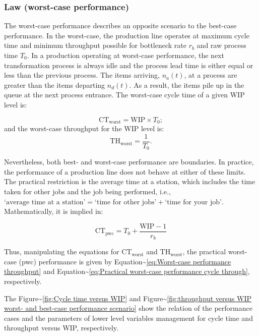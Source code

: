 \documentclass{article}
\begin{document}
\subsubsection{Law (worst-case performance)}
\label{sec:orgefeb215}

The worst-case performance describes an opposite scenario to the best-case performance.
In the worst-case, the production line operates at maximum cycle time and minimum throughput possible for bottleneck rate \(r_b\) and raw process time \(T_0\).
In a production operating at worst-case performance, the next transformation process is always idle and the process lead time is either equal or less than the previous process.
The items arriving, \(n_a(t)\), at a process are greater than the items departing \(n_d(t)\).
As a result, the items pile up in the queue at the next process entrance.
The worst-case cycle time of a given WIP level is:

\begin{equation}\label{eq:Worst-case performance cycle through}
    \mbox{CT}_{\mbox{worst}} = \mbox{WIP} \times T_0;
\end{equation}
\nolinebreak
and the worst-case throughput for the WIP level is:
\begin{equation}\label{eq:Worst-case performance throughput}
    \mbox{TH}_{\mbox{worst}} = \frac{1}{T_0}.
\end{equation}

Nevertheless, both best- and worst-case performance are boundaries.
In practice, the performance of a production line does not behave at either of these limits.
The practical restriction is the average time at a station, which includes the time taken for other jobs and the job being performed, i.e., \(\mbox{`average time at a station'} = \mbox{`time for other jobs'} + \mbox{`time for your job'}\).
Mathematically, it is implied in:

\begin{equation}
    \mbox{CT}_{\mbox{pwc}}=T_0 + \frac{\mbox{WIP}-1}{r_b}
\label{eq:Practical worst-case performance cycle through}
\end{equation}

Thus, manipulating the equations for \(\mbox{CT}_{\mbox{worst}}\) and \(\mbox{TH}_{\mbox{worst}}\), the practical worst-case (pwc) performance is given by Equation\textasciitilde{}\ref{eq:Worst-case performance throughput} and Equation\textasciitilde{}\ref{eq:Practical worst-case performance cycle through}, respectively.

The Figure\textasciitilde{}\ref{fig:Cycle time versus WIP} and Figure\textasciitilde{}\ref{fig:throughput versus WIP worst- and best-case performance scenario} show the relation of the performance cases and the parameters of lower level variables management for cycle time and throughput versus WIP, respectively.
\end{document}
